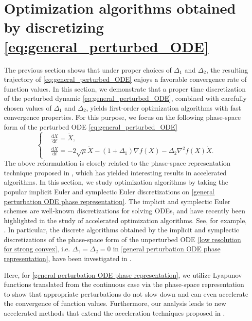 \documentclass[11pt]{article}
\newcommand{\1}{\mathbf 1}
\numberwithin{equation}{section}
\begin{document}
\section{Optimization algorithms obtained by discretizing \texorpdfstring{\eqref{eq:general_perturbed_ODE}}{(general perturbed ODE)}}
\label{sec: discrete case}

The previous section shows that under proper choices of $\Delta_1$ and $\Delta_2$, the resulting trajectory of \eqref{eq:general_perturbed_ODE} enjoys a favorable convergence rate of function values.  In this section, we demonstrate that a proper time discretization of the perturbed dynamic \eqref{eq:general_perturbed_ODE}, combined with carefully chosen values of $\Delta_1$ and $\Delta_2$, yields first-order optimization algorithms with fast convergence properties.
For this purpose, we focus on the following phase-space form of the perturbed ODE \eqref{eq:general_perturbed_ODE}
\begin{equation}
	\label{general perturbation ODE phase representation}
	\left\{
	\begin{aligned}
		&\frac{\mathrm{d} X}{\mathrm{d} t}=\dot{X},\\
		&\frac{\mathrm{d} \dot{X}}{\mathrm{d} t}=-2\sqrt{\mu}\dot{X}-(1+\Delta_1)\nabla f(X)-\Delta_2\nabla^2 f(X)\dot{X}.
	\end{aligned}
	\right.
\end{equation}
The above reformulation is closely related to the phase-space representation technique proposed in \cite{Shi_2022_understanding}, which has yielded interesting results \cite{Chen_2022_gradient, Li_2022_proximal,  Li_2024_linear, Shi_2019_acceleration} in accelerated algorithms.
In this section, we study optimization algorithms by taking the popular implicit Euler and symplectic Euler discretizations on \eqref{general perturbation ODE phase representation}.
The implicit and symplectic Euler schemes are well-known discretizations for solving ODEs, and have recently been highlighted in the study of accelerated optimization algorithms. See, for example, \cite{Betancourt_2018_symplectic, Jordan_2018_dynamical, Shi_2019_acceleration, França_2021_dissipative}. In particular, the discrete algorithms obtained by the implicit and symplectic discretizations of the phase-space form of the unperturbed ODE \eqref{low resolution for strong convex}, i.e. $\Delta_1 = \Delta_2 = 0$ in \eqref{general perturbation ODE phase representation}, have been investigated in \cite{Shi_2019_acceleration}. 

Here, for \eqref{general perturbation ODE phase representation}, we utilize Lyapunov functions translated from the continuous case via the phase-space representation to show that appropriate perturbations do not slow down and can even accelerate the convergence of function values. Furthermore, our analysis leads to new accelerated methods that extend the acceleration techniques proposed in \cite{Shi_2019_acceleration}.
\end{document}
